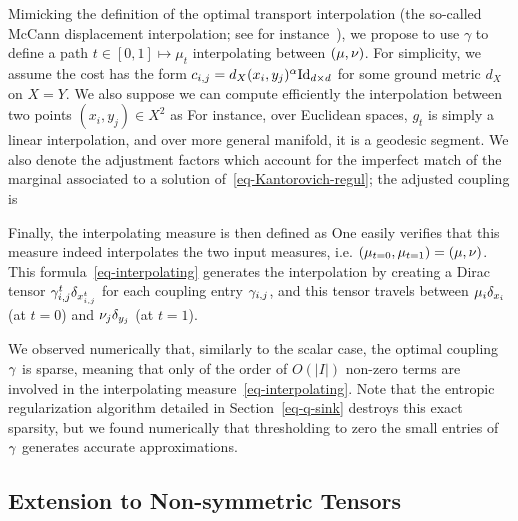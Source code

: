 Mimicking the definition of the optimal transport interpolation (the so-called McCann displacement interpolation; see for instance~\cite{santambrogio2015optimal}), we propose to use $\gamma$ to define a path $t \in [0,1] \mapsto \mu_t$ interpolating between $(\mu,\nu)$. 
%
For simplicity, we assume the cost has the form $c_{i,j}=d_X(x_i,y_j)^\alpha \mathrm{Id}_{d \times d}$ for some ground metric $d_X$ on $X=Y$. We also suppose we can compute efficiently the interpolation between two points $(x_i,y_j) \in X^2$ as
For instance, over Euclidean spaces, $g_t$ is simply a linear interpolation, and over more general manifold, it is a geodesic segment.
We also denote
the adjustment factors which account for the imperfect match of the marginal associated to a solution of~\eqref{eq-Kantorovich-regul}; the adjusted coupling is

Finally, the interpolating measure is then defined as
One easily verifies that this measure indeed interpolates the two input measures, i.e. 
$(\mu_{t=0},\mu_{t=1})=(\mu,\nu)$. 
%
This formula~\eqref{eq-interpolating} generates the interpolation by creating a Dirac tensor $ \gamma_{i,j}^t \delta_{x_{i,j}^t}$ for each coupling entry $\gamma_{i,j}$, and this tensor travels between $\mu_i \delta_{x_i}$ (at $t=0$) and $\nu_j \delta_{y_j}$ (at $t=1$).

\begin{rem} We observed numerically that, similarly to the scalar case, the optimal coupling $\gamma$ is sparse, meaning that only of the order of $O(|I|)$ non-zero terms are involved in the interpolating measure~\eqref{eq-interpolating}. Note that the entropic regularization algorithm detailed in Section~\ref{eq-q-sink} destroys this exact sparsity, but we found numerically that thresholding to zero the small entries of $\gamma$ generates accurate approximations. 
\end{rem}


\subsection{Extension to Non-symmetric Tensors}


\fi
